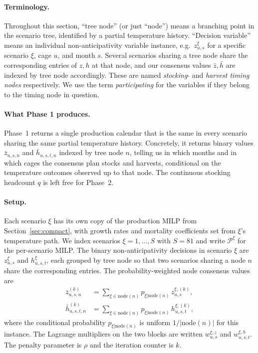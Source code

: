 \documentclass[12pt,a4paper]{article}
\begin{document}
 \paragraph{Terminology.}
Throughout this section, ``tree node'' (or just ``node'') means a branching point in the scenario tree, identified by a partial temperature history. ``Decision variable'' means an individual non-anticipativity variable instance, e.g.~$z^\xi_{u,s}$ for a specific scenario $\xi$, cage $u$, and month $s$. Several scenarios sharing a tree node share the corresponding entries of $z, h$ at that node, and our consensus values $\bar{z}, \bar{h}$ are indexed by tree node accordingly. These are named \textit{stocking}- and \textit{harvest timing nodes} respectively. We use the term \textit{participating} for the variables if they belong to the timing node in question.

\paragraph{What Phase 1 produces.}
Phase~1 returns a single production calendar that is the same in every scenario sharing the same partial temperature history. Concretely, it returns binary values $\bar{z}_{u,s,n}$ and $\bar{h}_{u,s,t,n}$ indexed by tree node $n$, telling us in which months and in which cages the consensus plan stocks and harvests, conditional on the temperature outcomes observed up to that node. The continuous stocking headcount $q$ is left free for Phase~2.

\paragraph{Setup.}
Each scenario $\xi$ has its own copy of the production MILP from Section~\ref{sec:compact}, with growth rates and mortality coefficients set from $\xi$'s temperature path. We index scenarios $\xi = 1, \ldots, S$ with $S=81$ and write $\mathcal{P}^\xi$ for the per-scenario MILP. The binary non-anticipativity decisions in scenario $\xi$ are $z^\xi_{u,s}$ and $h^\xi_{u,s,t}$, each grouped by tree node so that two scenarios sharing a node $n$ share the corresponding entries. The probability-weighted node consensus values are
\begin{align}
  \bar{z}^{(k)}_{u,s,n}    &= \sum_{\xi \in \mathrm{node}(n)} p_{\xi|\mathrm{node}(n)}\, z^{\xi,(k)}_{u,s},\\
  \bar{h}^{(k)}_{u,s,t,n}  &= \sum_{\xi \in \mathrm{node}(n)} p_{\xi|\mathrm{node}(n)}\, h^{\xi,(k)}_{u,s,t},
\end{align}
where the conditional probability $p_{\xi|\mathrm{node}(n)}$ is uniform $1/|\mathrm{node}(n)|$ for this instance. The Lagrange multipliers on the two blocks are written $w^{\xi,z}_{u,s}$ and $w^{\xi,h}_{u,s,t}$. The penalty parameter is $\rho$ and the iteration counter is $k$.
\end{document}
